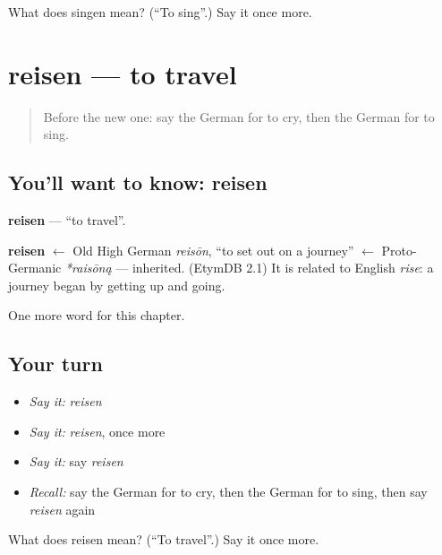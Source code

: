 \begin{tcolorbox}[breakable,colback=teal!4,colframe=teal!35!black,title={Before you move on}]
What does singen mean? (\textquotedblleft{}To sing\textquotedblright{}.) Say it once more.
\end{tcolorbox}
\section[reisen]{reisen — to travel}

\label{lesson:GE-C66-reisen}



\begin{quote}
Before the new one: say the German for to cry, then the German for to sing.
\end{quote}

\subsection*{You'll want to know: reisen}
\textbf{reisen} — \textquotedblleft{}to travel\textquotedblright{}.

\begin{cousinweb}
\textbf{reisen} $\leftarrow$ Old High German \emph{reisōn}, \textquotedblleft{}to set out on a journey\textquotedblright{} $\leftarrow$ Proto-Germanic \emph{*raisōną} — inherited. (EtymDB 2.1) It is related to English \emph{rise}: a journey began by getting up and going.
\end{cousinweb}

\begin{grammarlens}[title={What you've built}]
One more word for this chapter.
\end{grammarlens}

\subsection*{Your turn}
\begin{itemize}
\raggedright
  \item \emph{Say it:} \emph{reisen}
  \item \emph{Say it:} \emph{reisen}, once more
  \item \emph{Say it:} say \emph{reisen}
  \item \emph{Recall:} say the German for to cry, then the German for to sing, then say \emph{reisen} again
\end{itemize}

\begin{tcolorbox}[breakable,colback=teal!4,colframe=teal!35!black,title={Before you move on}]
What does reisen mean? (\textquotedblleft{}To travel\textquotedblright{}.) Say it once more.
\end{tcolorbox}
